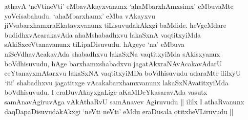 \begin{artha}
athavA `neVtineVti' eMbavAkayxvanunx `ahaMbarxhAmxsimx' eMbuvaMte
yoVcisabahudu.  `ahaMbarxhamx' eMba vAkayxvu
jiVvabarxhamxraEkatavxvanunx tiLisuvudakAkxgi baMdide. heVgeMdare
budidhxvAcarakavAda ahaMshabadhxvu lakaSxnA vaqtitxyiMda
sAkiSxceVtanavanunx tiLipaDisuvudu. hAgeye `na' eMbuva
niSeVdhavAcakavAda shabadhxvu lakaSxNa vaqtitxyiMda sAkisxyanux
boVdhisuvudu, hAge barxhamxshabadxvu jagatAkxraNAvAcakavAdarU
ceYtanayxmAtarxvu lakaSxNA vaqtitxyiMDa boVdhisuvudu adaraMte ililxyU
`iti' shabadhxvu jagatitxge vAcakabarxhamxvanunx lakaSxNAvatitxyiMda
boVdhisuvudu. I eraDuvAkayxgaLige aKaMDeYkasaravAda vasutx
samAnavAgiruvAga vAkAthaRvU samAnavev Agiruvudu || ililx I athaRvanunx
daqDapaDisuvudakAkxgi `neVti neVti' eMdu eraDusala otitxheVLiruvudu ||
\end{artha}

\begin{center}


\end{center}

